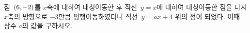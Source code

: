 점~$(6{,}\mkern3mu\mathopen{}-2)$를 $x$축에 대하여 대칭이동한 후 직선~$y=x$에 대하여 대칭이동한 점을 다시 $x$축의 방향으로 $-3$만큼 평행이동하였더니 직선~$y=ax+4$ 위의 점이 되었다. 이때 상수 $a$의 값을 구하시오.
